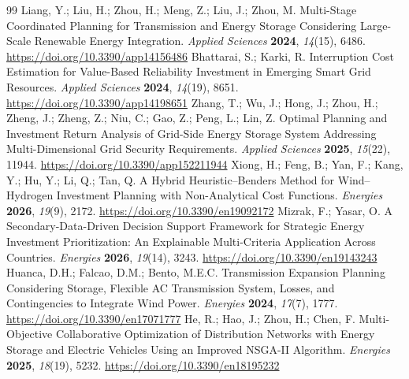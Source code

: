 \documentclass[energies,article,submit,moreauthors]{Definitions/mdpi}
\begin{document}
\begin{thebibliography}{99}
 Liang, Y.; Liu, H.; Zhou, H.; Meng, Z.; Liu, J.; Zhou, M. Multi-Stage Coordinated Planning for Transmission and Energy Storage Considering Large-Scale Renewable Energy Integration. \emph{Applied Sciences} \textbf{2024}, \emph{14}(15), 6486. \url{https://doi.org/10.3390/app14156486}
 Bhattarai, S.; Karki, R. Interruption Cost Estimation for Value-Based Reliability Investment in Emerging Smart Grid Resources. \emph{Applied Sciences} \textbf{2024}, \emph{14}(19), 8651. \url{https://doi.org/10.3390/app14198651}
 Zhang, T.; Wu, J.; Hong, J.; Zhou, H.; Zheng, J.; Zheng, Z.; Niu, C.; Gao, Z.; Peng, L.; Lin, Z. Optimal Planning and Investment Return Analysis of Grid-Side Energy Storage System Addressing Multi-Dimensional Grid Security Requirements. \emph{Applied Sciences} \textbf{2025}, \emph{15}(22), 11944. \url{https://doi.org/10.3390/app152211944}
 Xiong, H.; Feng, B.; Yan, F.; Kang, Y.; Hu, Y.; Li, Q.; Tan, Q. A Hybrid Heuristic--Benders Method for Wind--Hydrogen Investment Planning with Non-Analytical Cost Functions. \emph{Energies} \textbf{2026}, \emph{19}(9), 2172. \url{https://doi.org/10.3390/en19092172}
 Mizrak, F.; Yasar, O. A Secondary-Data-Driven Decision Support Framework for Strategic Energy Investment Prioritization: An Explainable Multi-Criteria Application Across Countries. \emph{Energies} \textbf{2026}, \emph{19}(14), 3243. \url{https://doi.org/10.3390/en19143243}
 Huanca, D.H.; Falcao, D.M.; Bento, M.E.C. Transmission Expansion Planning Considering Storage, Flexible AC Transmission System, Losses, and Contingencies to Integrate Wind Power. \emph{Energies} \textbf{2024}, \emph{17}(7), 1777. \url{https://doi.org/10.3390/en17071777}
 He, R.; Hao, J.; Zhou, H.; Chen, F. Multi-Objective Collaborative Optimization of Distribution Networks with Energy Storage and Electric Vehicles Using an Improved NSGA-II Algorithm. \emph{Energies} \textbf{2025}, \emph{18}(19), 5232. \url{https://doi.org/10.3390/en18195232}
\end{thebibliography}
\end{document}
